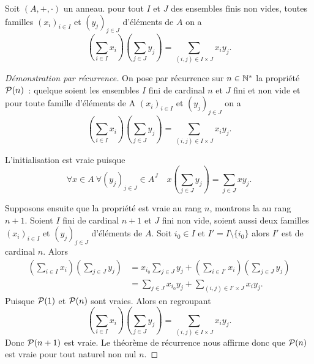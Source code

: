 \begin{theo}
  Soit \((A,+,\cdot)\) un anneau. pour tout \(I\) et \(J\) des ensembles finis non vides, toutes familles \((x_i)_{i \in I}\) et \((y_j)_{j \in J}\) d'éléments de \(A\) on a
  \begin{equation}
    \left(\sum_{i \in I} x_i \right)\left(\sum_{j \in J} y_j \right) = \sum_{(i,j)\in I\times J} x_iy_j.
  \end{equation}
\end{theo}
\begin{proof}[Démonstration par récurrence]
  On pose par récurrence sur \(n \in \N^*\) la propriété \(\P(n)\)~: quelque soient les ensembles \(I\) fini de cardinal \(n\) et \(J\) fini et non vide et pour toute famille d'éléments de A \((x_i)_{i \in I}\) et \((y_j)_{j \in J}\) on a
  \begin{equation} 
    \left(\sum_{i \in I} x_i \right)\left(\sum_{j \in J} y_j \right) = \sum_{(i,j)\in I\times J} x_iy_j.
  \end{equation}

  L'initialisation est vraie puisque
  \begin{equation}
    \forall x \in A \ \forall (y_j)_{j \in J} \in A^J \quad x \left(\sum_{j \in J} y_j \right) = \sum_{j \in J} xy_j.
  \end{equation}

  Supposons ensuite que la propriété est vraie au rang \(n\), montrons la au rang \(n+1\). Soient \(I\) fini de cardinal \(n+1\) et \(J\) fini non vide, soient aussi deux familles \((x_i)_{i \in I}\) et \((y_j)_{j \in J}\) d'éléments de \(A\). Soit \(i_0 \in I\) et \(I'=I\setminus\{i_0\}\) alors \(I'\) est de cardinal \(n\). Alors
  \begin{align}
    \left(\sum_{i \in I} x_i \right)\left(\sum_{j \in J} y_j \right) &=x_{i_0} \sum_{j \in J} y_j + \left(\sum_{i \in I'} x_i \right)\left(\sum_{j \in J} y_j \right) \\
                                                                     &=\sum_{j \in J} x_{i_0}y_j +  \sum_{(i,j)\in I'\times J} x_iy_j.
  \end{align}
  Puisque \(\P(1)\) et \(\P(n)\) sont vraies. Alors en regroupant
  \begin{equation}
    \left(\sum_{i \in I} x_i \right)\left(\sum_{j \in J} y_j \right) = \sum_{(i,j)\in I\times J} x_iy_j.
  \end{equation}
  Donc \(\P(n+1)\) est vraie. Le théorème de récurrence nous affirme donc que \(\P(n)\) est vraie pour tout naturel non nul \(n\).
\end{proof}
